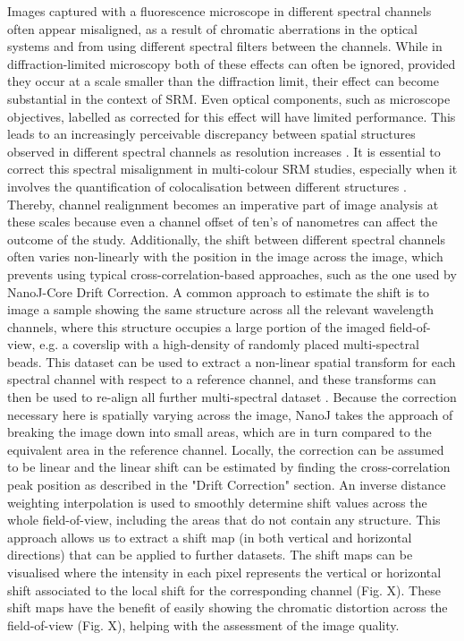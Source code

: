  Images captured with a fluorescence microscope in different spectral channels often appear misaligned, as a result of chromatic aberrations in the optical systems and from using different spectral filters between the channels. While in diffraction-limited microscopy both of these effects can often be ignored, provided they occur at a scale smaller than the diffraction limit, their effect can become substantial in the context of SRM. Even optical components, such as microscope objectives, labelled as corrected for this effect will have limited performance. This leads to an increasingly perceivable discrepancy between spatial structures observed in different spectral channels as resolution increases \cite{erdelyi2013correcting}. It is essential to correct this spectral misalignment in multi-colour SRM studies, especially when it involves the quantification of colocalisation between different structures \cite{bock2007two,van2009multicolor,niekamp2017high}. Thereby, channel realignment becomes an imperative part of image analysis at these scales because even a channel offset of ten's of nanometres can affect the outcome of the study. Additionally, the shift between different spectral channels often varies non-linearly with the position in the image across the image, which prevents using typical cross-correlation-based approaches, such as the one used by NanoJ-Core Drift Correction.
 A common approach to estimate the shift is to image a sample showing the same structure across all the relevant wavelength channels, where this structure occupies a large portion of the imaged field-of-view, e.g. a coverslip with a high-density of randomly placed multi-spectral beads. This dataset can be used to extract a non-linear spatial transform for each spectral channel with respect to a reference channel, and these transforms can then be used to re-align all further multi-spectral dataset \cite{arganda2006consistent,annibale2012identification}. Because the correction necessary here is spatially varying across the image, NanoJ takes the approach of breaking the image down into small areas, which are in turn compared to the equivalent area in the reference channel. Locally, the correction can be assumed to be linear and the linear shift can be estimated by finding the cross-correlation peak position as described in the "Drift Correction" section. An inverse distance weighting interpolation \cite{shepard1968two} is used to smoothly determine shift values across the whole field-of-view, including the areas that do not contain any structure. This approach allows us to extract a shift map (in both vertical and horizontal directions) that can be applied to further datasets. The shift maps can be visualised where the intensity in each pixel represents the vertical or horizontal shift associated to the local shift for the corresponding channel (Fig. X). These shift maps have the benefit of easily showing the chromatic distortion across the field-of-view (Fig. X), helping with the assessment of the image quality. 
 
